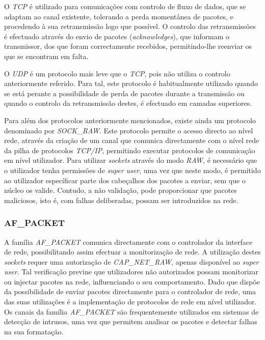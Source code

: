 O \textit{TCP} é utilizado para comunicações com controlo de fluxo de dados, que se adaptam ao canal existente, tolerando a perda momentânea de pacotes, e procedendo à sua retransmissão logo que possível.
O controlo das retransmissões é efectuado através do envio de pacotes (\textit{acknowledges}), que informam o transmissor, dos que foram correctamente recebidos, permitindo-lhe reenviar os que se encontram em falta.

O \textit{UDP} é um protocolo mais leve que o \textit{TCP}, pois não utiliza o controlo anteriormente referido.
Para tal, este protocolo é habitualmente utilizado quando se está perante a possibilidade de perda de pacotes durante a transmissão ou quando o controlo da retransmissão destes, é efectuado em camadas superiores.

Para além dos protocolos anteriormente mencionados, existe ainda um protocolo denominado por \textit{SOCK\_RAW}.
Este protocolo permite o acesso directo ao nível rede, através da criação de um canal que comunica directamente com o nível rede da pilha de protocolos \textit{TCP/IP}, permitindo executar protocolos de comunicação em nível utilizador.
Para utilizar \textit{sockets} através do modo \textit{RAW}, é necessário que o utilizador tenha permissões de \textit{super user}, uma vez que neste modo, é permitido ao utilizador específicar parte dos cabeçalhos dos pacotes a enviar, sem que o núcleo os valide.
Contudo, a não validação, pode proporcionar que pacotes maliciosos, isto é, com falhas deliberadas, possam ser introduzidos na rede.
 
\subsubsection{AF\_PACKET}
\label{subsub:af_packet}

A família \textit{AF\_PACKET} comunica directamente com o controlador da interface de rede, possibilitando assim efectuar a monitorização de rede.
A utilização destes \textit{sockets} requer uma autorização de \textit{CAP\_NET\_RAW}, apenas disponível ao \textit{super user}.
Tal verificação previne que utilizadores não autorizados possam monitorizar ou injectar pacotes na rede, influenciando o seu comportamento.
Dado que dispõe da possibilidade de enviar pacotes directamente para o controlador de rede, uma das suas utilizações é a implementação de protocolos de rede em nível utilizador.
Os canais da família \textit{AF\_PACKET} são frequentemente utilizados em sistemas de detecção de intrusos, uma vez que permitem analisar os pacotes e detectar falhas na sua formatação.

